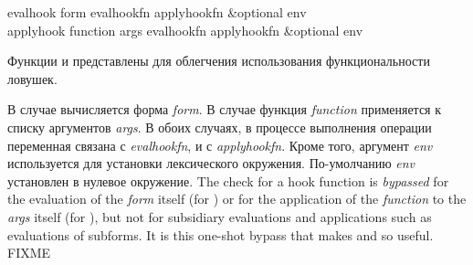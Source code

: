 \begin{defun}[Функция]
evalhook form evalhookfn applyhookfn &optional env \\
applyhook function args evalhookfn applyhookfn &optional env

Функции  и  представлены для облегчения
использования функциональности ловушек.

В случае  вычисляется форма \emph{form}.
В случае  функция \emph{function} применяется к списку аргументов
\emph{args}.
В обоих случаях, в процессе выполнения операции переменная 
связана с \emph{evalhookfn}, и  с \emph{applyhookfn}.
Кроме того, аргумент \emph{env} используется для установки лексического
окружения.
По-умолчанию \emph{env} установлен в нулевое окружение.
The check for a hook function is \emph{bypassed} for the evaluation
of the \emph{form} itself (for ) or for the application
of the \emph{function} to the \emph{args} itself (for ),
but not for subsidiary evaluations and applications
such as evaluations of subforms.  It is this one-shot bypass that makes
 and  so useful. FIXME


\end{defun}
